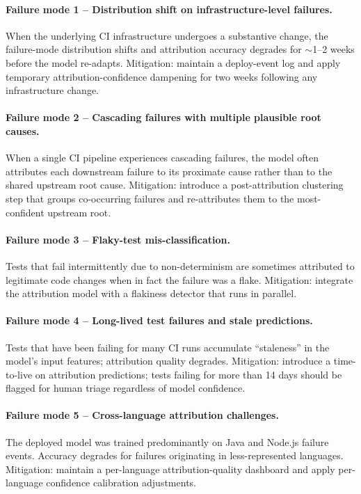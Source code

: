\documentclass[11pt,a4paper]{article}
\begin{document}
\paragraph{Failure mode 1 -- Distribution shift on infrastructure-level failures.} When the underlying CI infrastructure undergoes a substantive change, the failure-mode distribution shifts and attribution accuracy degrades for $\sim$1--2 weeks before the model re-adapts. Mitigation: maintain a deploy-event log and apply temporary attribution-confidence dampening for two weeks following any infrastructure change.

\paragraph{Failure mode 2 -- Cascading failures with multiple plausible root causes.} When a single CI pipeline experiences cascading failures, the model often attributes each downstream failure to its proximate cause rather than to the shared upstream root cause. Mitigation: introduce a post-attribution clustering step that groups co-occurring failures and re-attributes them to the most-confident upstream root.

\paragraph{Failure mode 3 -- Flaky-test mis-classification.} Tests that fail intermittently due to non-determinism are sometimes attributed to legitimate code changes when in fact the failure was a flake. Mitigation: integrate the attribution model with a flakiness detector that runs in parallel.

\paragraph{Failure mode 4 -- Long-lived test failures and stale predictions.} Tests that have been failing for many CI runs accumulate ``staleness'' in the model's input features; attribution quality degrades. Mitigation: introduce a time-to-live on attribution predictions; tests failing for more than 14 days should be flagged for human triage regardless of model confidence.

\paragraph{Failure mode 5 -- Cross-language attribution challenges.} The deployed model was trained predominantly on Java and Node.js failure events. Accuracy degrades for failures originating in less-represented languages. Mitigation: maintain a per-language attribution-quality dashboard and apply per-language confidence calibration adjustments.
\end{document}
